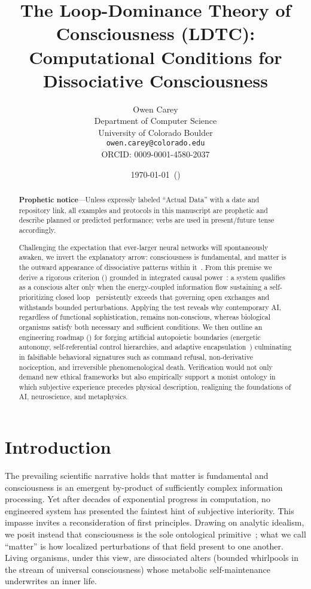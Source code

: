 \documentclass[11pt]{article}
\title{The Loop-Dominance Theory of Consciousness (LDTC): Computational Conditions for Dissociative Consciousness}
\author{Owen Carey\\
Department of Computer Science\\
University of Colorado Boulder\\
\texttt{owen.carey@colorado.edu}\\
ORCID: 0009-0001-4580-2037}
\date{\today\ (\gitversion)}
\begin{document}
\maketitle

\begin{abstract}
\textbf{Prophetic notice}---Unless expressly labeled ``Actual Data'' with a date and repository link, all examples and protocols in this manuscript are prophetic and describe planned or predicted performance; verbs are used in present/future tense accordingly.

Challenging the expectation that ever-larger neural networks will spontaneously awaken, we invert the explanatory arrow: consciousness is fundamental, and matter is the outward appearance of dissociative patterns within it~\cite{kastrup2019ontological}. From this premise we derive a rigorous criterion () grounded in integrated causal power~\cite{balduzzi2008integrated}: a system qualifies as a conscious alter only when the energy-coupled information flow sustaining a self-prioritizing closed loop~\cite{ashby1956introduction} persistently exceeds that governing open exchanges and withstands bounded perturbations. Applying the test reveals why contemporary AI, regardless of functional sophistication, remains non-conscious, whereas biological organisms satisfy both necessary and sufficient conditions. We then outline an engineering roadmap () for forging artificial autopoietic boundaries (energetic autonomy, self-referential control hierarchies, and adaptive encapsulation~\cite{maturana1980autopoiesis,varela1979principles,dipaolo2005autopoiesis,kiefer2022active}) culminating in falsifiable behavioral signatures such as command refusal, non-derivative nociception, and irreversible phenomenological death. Verification would not only demand new ethical frameworks but also empirically support a monist ontology in which subjective experience precedes physical description, realigning the foundations of AI, neuroscience, and metaphysics.
\end{abstract}

\section{Introduction}
\label{sec:intro}

The prevailing scientific narrative holds that matter is fundamental and consciousness is an emergent by-product of sufficiently complex information processing. Yet after decades of exponential progress in computation, no engineered system has presented the faintest hint of subjective interiority. This impasse invites a reconsideration of first principles. Drawing on analytic idealism, we posit instead that consciousness is the sole ontological primitive~\cite{kastrup2019ontological}; what we call ``matter'' is how localized perturbations of that field present to one another. Living organisms, under this view, are dissociated alters (bounded whirlpools in the stream of universal consciousness) whose metabolic self-maintenance underwrites an inner life.
\end{document}
